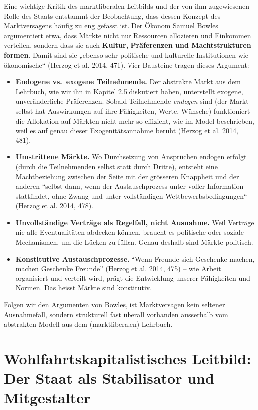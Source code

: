 \documentclass[
  nswissgerman,
  a4paper,
  DIV=11,
  numbers=noendperiod,
  oneside,
  openany]{scrreprt}
\providecommand{\tightlist}{%
  \setlength{\itemsep}{0pt}\setlength{\parskip}{0pt}}
\begin{document}
Eine wichtige Kritik des marktliberalen Leitbilds und der von ihm
zugewiesenen Rolle des Staats entstammt der Beobachtung, dass dessen
Konzept des Marktversagens häufig zu eng gefasst ist. Der Ökonom Samuel
Bowles argumentiert etwa, dass Märkte nicht nur Ressourcen allozieren
und Einkommen verteilen, sondern dass sie auch \textbf{Kultur,
Präferenzen und Machtstrukturen formen}. Damit sind sie „ebenso sehr
politische und kulturelle Institutionen wie ökonomische`` (Herzog et al.
2014, 471). Vier Bausteine tragen dieses Argument:

\begin{itemize}
\tightlist
\item
  \textbf{Endogene vs.~exogene Teilnehmende.} Der abstrakte Markt aus
  dem Lehrbuch, wie wir ihn in Kapitel 2.5 diskutiert haben, unterstellt
  exogene, unveränderliche Präferenzen. Sobald Teilnehmende
  \emph{endogen} sind (der Markt selbst hat Auswirkungen auf ihre
  Fähigkeiten, Werte, Wünsche) funktioniert die Allokation auf Märkten
  nicht mehr so effizient, wie im Model beschrieben, weil es auf genau
  dieser Exogenitätsannahme beruht (Herzog et al. 2014, 481).
\item
  \textbf{Umstrittene Märkte.} Wo Durchsetzung von Ansprüchen endogen
  erfolgt (durch die Teilnehmenden selbst statt durch Dritte), entsteht
  eine Machtbeziehung zwischen der Seite mit der grösseren Knappheit und
  der anderen ``selbst dann, wenn der Austauschprozess unter voller
  Information stattfindet, ohne Zwang und unter vollständigen
  Wettbewerbsbedingungen`` (Herzog et al. 2014, 478).
\item
  \textbf{Unvollständige Verträge als Regelfall, nicht Ausnahme.} Weil
  Verträge nie alle Eventualitäten abdecken können, braucht es
  politische oder soziale Mechanismen, um die Lücken zu füllen. Genau
  deshalb sind Märkte politisch.
\item
  \textbf{Konstitutive Austauschprozesse.} ``Wenn Freunde sich Geschenke
  machen, machen Geschenke Freunde'' (Herzog et al. 2014, 475) -- wie
  Arbeit organisiert und verteilt wird, prägt die Entwicklung unserer
  Fähigkeiten und Normen. Das heisst Märkte sind konstitutiv.
\end{itemize}

Folgen wir den Argumenten von Bowles, ist Marktversagen kein seltener
Ausnahmefall, sondern strukturell fast überall vorhanden ausserhalb vom
abstrakten Modell aus dem (marktliberalen) Lehrbuch.

\section{Wohlfahrtskapitalistisches Leitbild: Der Staat als Stabilisator
und
Mitgestalter}\label{wohlfahrtskapitalistisches-leitbild-der-staat-als-stabilisator-und-mitgestalter}
\end{document}
